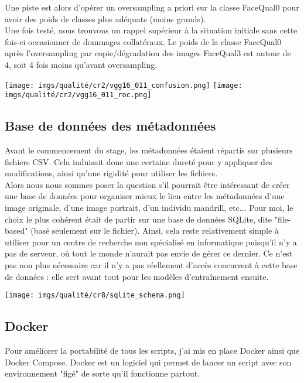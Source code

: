 Une piste est alors d'opérer un oversampling a priori sur la classe FaceQual0 pour avoir des poids de classes plus adéquats (moins grands). \\

Une fois testé, nous trouvons un rappel supérieur à la situation initiale sans cette fois-ci occasionner de dommages collatéraux. Le poids de la classe FaceQual0 après l'oversampling par copie/dégradation des images FaceQual3 est autour de 4, soit 4 fois moins qu'avant oversampling.

\begin{center}
    \texttt{[image: imgs/qualité/cr2/vgg16\_011\_confusion.png]}
    \texttt{[image: imgs/qualité/cr2/vgg16\_011\_roc.png]}
\end{center}

\subsection{Base de données des métadonnées}
Avant le commencement du stage, les métadonnées étaient répartis sur plusieurs fichiers CSV. Cela induisait donc une certaine dureté pour y appliquer des modifications, ainsi qu'une rigidité pour utiliser les fichiers.\\

Alors nous nous sommes poser la question s'il pourrait être intéressant de créer une base de données pour organiser mieux le lien entre les métadonnées d'une image originale, d'une image portrait, d'un individu mandrill, etc...
Pour moi, le choix le plus cohérent était de partir sur une base de données SQLite, dite "file-based" (basé seulement sur le fichier). Ainsi, cela reste relativement simple à utiliser pour un centre de recherche non spécialisé en informatique puisqu'il n'y a pas de serveur, où tout le monde n'aurait pas envie de gérer ce dernier. Ce n'est pas non plus nécessaire car il n'y a pas réellement d'accès concurrent à cette base de données : elle sert avant tout pour les modèles d'entraînement ensuite.

\begin{center}
    \texttt{[image: imgs/qualité/cr8/sqlite\_schema.png]}
\end{center}

\subsection{Docker}
Pour améliorer la portabilité de tous les scripts, j'ai mis en place Docker ainsi que Docker Compose. Docker est un logiciel qui permet de lancer un script avec son environnement "figé" de sorte qu'il fonctionne partout.\\

